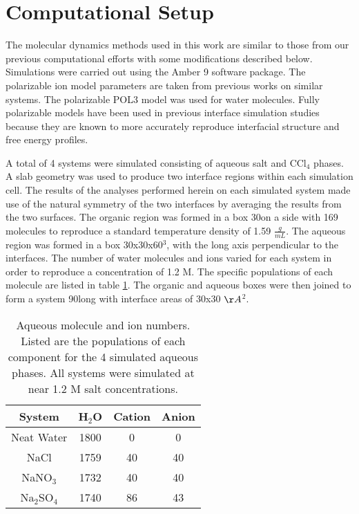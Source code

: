\section{Computational Setup}

The molecular dynamics methods used in this work are similar to those from our previous computational efforts with some modifications described below.\cite{Hore2008,Walker2006b,Hore2007} Simulations were carried out using the Amber 9 software package. The polarizable ion model parameters are taken from previous works on similar systems.\cite{Chang1997a,Dang1999,Thomas2007,Hrobarik2006,Chang1995} The polarizable POL3 model was used for water molecules.\cite{Caldwell1995} Fully polarizable models have been used in previous interface simulation studies because they are known to more accurately reproduce interfacial structure and free energy profiles.\cite{Rivera2006,Wick2007,Petersen2005b,Salvador2003,Dang1998}

A total of 4 systems were simulated consisting of aqueous salt and CCl$_4$ phases. A slab geometry was used to produce two interface regions within each simulation cell.\cite{Hore2007}  The results of the analyses performed herein on each simulated system made use of the natural symmetry of the two interfaces by averaging the results from the two surfaces. The organic region was formed in a box 30\angs on a side with 169 \ctc molecules to reproduce a standard temperature density of 1.59 $\frac{g}{mL}$. The aqueous region was formed in a box 30x30x60\angs$^3$, with the long axis perpendicular to the interfaces. The number of water molecules and ions varied for each system in order to reproduce a concentration of 1.2 M. The specific populations of each molecule are listed in table \ref{densities}. The organic and aqueous boxes were then joined to form a system 90\angs long with interface areas of 30x30 $\AA$$^2$.

\begin{table}[htdp]
	\begin{center}
	\begin{tabular}{|c||c|c|c|}
		\hline
		System & H$_2$O & Cation & Anion \\ \hline
		Neat Water & 1800 & 0 & 0 \\ 
		NaCl & 1759 & 40 & 40 \\
		NaNO$_3$ & 1732 & 40 & 40 \\
		Na$_2$SO$_4$ & 1740 & 86 & 43 \\
		\hline
	\end{tabular}
	\end{center}
	\label{densities}
	\caption{Aqueous molecule and ion numbers. Listed are the populations of each component for the 4 simulated aqueous phases. All systems were simulated at near 1.2 M salt concentrations.}
\end{table}

